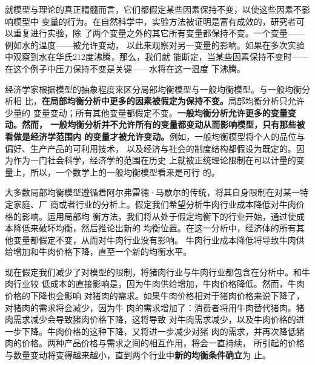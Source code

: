 就模型与理论的真正精髓而言，它们都假定某些因素保持不变，以使这些因素不影响模型中
变量的行为。在自然科学中，实验方法被证明是富有成效的，研究者可以重复进行实验，除
了两个变量之外的其它所有变量都保持不变。一个变量——例如水的温度——被允许变动，
以此来观察对另一变量的影响。如果在多次实验中观察到水在华氏212度沸腾，那么，我们就
能断定，当某些因素保持不变时——在这个例子中压力保持不变是关键——水将在这一温度
下沸腾。

经济学家根据模型的抽象程度来区分局部均衡模型与一般均衡模型。与一般均衡分析相
比，\textbf{在局部均衡分析中更多的因素被假定为保持不变。}局部均衡分析只允许少量的
变量变动；所有其他变量都假定不变。\textbf{一般均衡分析允许更多的变量变动。然而，
  一般均衡分析并不允许所有的变量都变动从而影响模型，只有那些被看做是经济学范围内
  的变量才被允许变动。}例如，一般均衡模型将个人的品位与偏好、生产产品的可利用技术，
以及经济与社会的制度结构都假设为既定的。因为作为一门社会科学，经济学的范围在历史
上就被正统理论限制在可以计量的变量上，所以，一个数学上的一般均衡模型看来是可行
的。

大多数局部均衡模型遵循着阿尔弗雷德·马歇尔的传统，将其自身限制在对某一特定家庭、厂
商或者行业的分析上。假定我们希望分析牛肉行业成本降低对牛肉价格的影响。运用局部均
衡方法，我们将从处于假定均衡下的行业开始，通过使成本降低来破坏均衡，然后推论出新的
均衡位置。在这一分析中，经济体的所有其他变量都假定不变，从而对牛肉行业没有影响。
牛肉行业成本降低将导致牛肉供给增加和牛肉价格下降，直至一个新的均衡水平。

现在假定我们减少了对模型的限制，将猪肉行业与牛肉行业都包含在分析中。和牛肉行业较
低成本的直接影响是，因为牛肉供给增加，牛肉价格降低。然而，牛肉价格的下降也会影响
对猪肉的需求。如果牛肉价格相对于猪肉价格来说下降了，对猪肉的需求将会减少，因为牛
肉的需求增加了：消费者将用牛肉替代猪肉。猪肉需求减少会导致猪肉价格下降，这将导致
对牛肉需求减少，以及牛肉价格的进一步下降。牛肉价格的这种下降，又将进一步减少对猪
肉的需求，并再次降低猪肉的价格。两种产品价格与需求之间的相互作用，将会一直持续，
所引起的价格与数量变动将变得越来越小，直到两个行业中\textbf{新的均衡条件确立}为
止。

